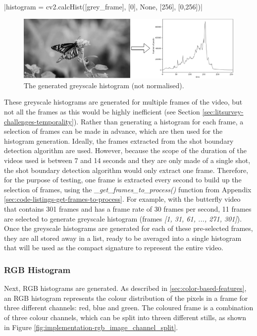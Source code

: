 |histogram = cv2.calcHist([grey_frame], [0], None, [256], [0,256])|

\begin{figure}[h] 
\centerline{\includegraphics[width=\textwidth]{figures/implementation/greyscale_not_normalised.png}}
\caption{\label{fig:implementation-greyscale_not_normalised}The generated greyscale histogram (not normalised).}
\end{figure}

These greyscale histograms are generated for multiple frames of the video, but not all the frames as this would be highly inefficient (see Section \ref{sec:litsurvey-challenges-temporality}). Rather than generating a histogram for each frame, a selection of frames can be made in advance, which are then used for the histogram generation. Ideally, the frames extracted from the shot boundary detection algorithm are used. However, because the scope of the duration of the videos used is between 7 and 14 seconds and they are only made of a single shot, the shot boundary detection algorithm would only extract one frame. Therefore, for the purpose of testing, one frame is extracted every second to build up the selection of frames, using the \textit{\_get\_frames\_to\_process()} function from Appendix \ref{sec:code-listings-get-frames-to-process}. For example, with the butterfly video that contains 301 frames and has a frame rate of 30 frames per second, 11 frames are selected to generate greyscale histogram (frames \textit{[1, 31, 61, ..., 271, 301]}). Once the greyscale histograms are generated for each of these pre-selected frames, they are all stored away in a list, ready to be averaged into a single histogram that will be used as the compact signature to represent the entire video. 


\subsubsection{RGB Histogram}

Next, RGB histograms are generated. As described in \ref{sec:color-based-features}, an RGB histogram represents the colour distribution of the pixels in a frame for three different channels: red, blue and green. The coloured frame is a combination of three colour channels, which can be split into threen different stills, as shown in Figure \ref{fig:implementation-rgb_image_channel_split}.

